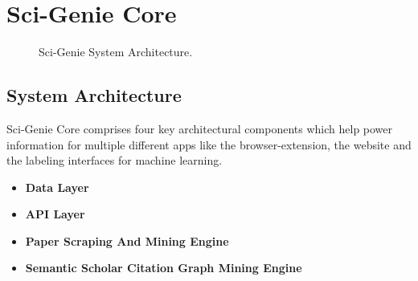 \chapter{Sci-Genie Core}
\label{sci-genie-core}
\begin{figure}[p]
    \centering
    \caption{Sci-Genie System Architecture. }
    \label{figure\arabic{figurecounter}}
\end{figure}

\section{System Architecture}

Sci-Genie Core comprises four key architectural components which help power information for multiple different apps like the browser-extension, the website and the labeling interfaces for machine learning. 
\begin{itemize}
    \item \textbf{Data Layer}
    \item \textbf{API Layer}
    \item \textbf{Paper Scraping And Mining Engine}
    \item \textbf{Semantic Scholar Citation Graph Mining Engine}
\end{itemize}

